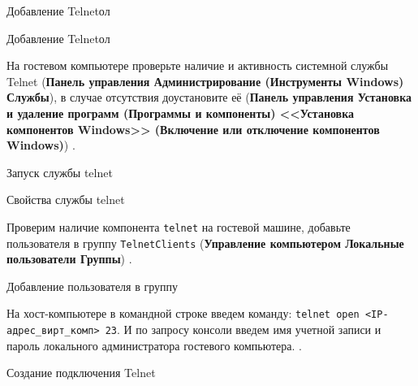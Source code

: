 \begin{image}
	\caption{Добавление Telnetол}
	\label{fig:telnet:client:on}
\end{image}

\begin{image}
	\caption{Добавление Telnetол}
	\label{fig:telnet:server:on}
\end{image}

На гостевом компьютере проверьте наличие и активность системной службы Telnet
(\textbf{Панель управления \rarrow Администрирование (Инструменты Windows)
\rarrow Службы}), в случае отсутствия доустановите её
(\textbf{Панель управления \rarrow Установка и удаление программ
(Программы и компоненты) \rarrow <<Установка компонентов Windows>>
(Включение или отключение компонентов Windows)})
.

\begin{image}
	\caption{Запуск службы telnet}
	\label{fig:telnet:demon:start}
\end{image}

\begin{image}
	\caption{Свойства службы telnet}
	\label{fig:telnet:demon:prop}
\end{image}

Проверим наличие компонента \texttt{telnet} на гостевой машине,
добавьте пользователя в группу \texttt{TelnetClients}
(\textbf{Управление компьютером \rarrow Локальные пользователи
\rarrow Группы}) .

\begin{image}
	\caption{Добавление пользователя в группу}
	\label{fig:telnet:group}
\end{image}


На хост-компьютере в командной строке введем команду:
\texttt{telnet open <IP-адрес\_вирт\_комп> 23}.
И по запросу консоли введем имя учетной записи
и пароль локального администратора гостевого компьютера.
.

\begin{image}
	\caption{Создание подключения Telnet}
	\label{fig:telnet:connection}
\end{image}

